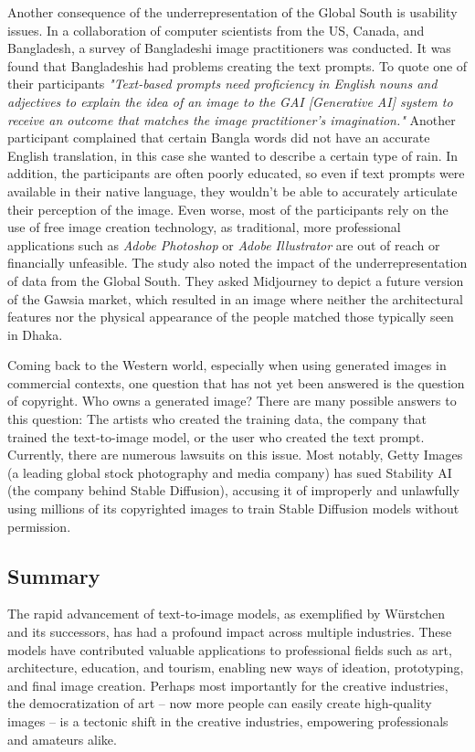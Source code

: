 \documentclass[11pt]{article}
\begin{document}
Another consequence of the underrepresentation of the Global South is usability issues. In a collaboration of computer scientists from the US, Canada, and Bangladesh\cite{mim2024impactoftexttoimagetoolsinglobalsouth}, a survey of Bangladeshi image practitioners was conducted. It was found that Bangladeshis had problems creating the text prompts. To quote one of their participants \textit{"Text-based prompts need proficiency in English nouns and adjectives to explain the idea of an image to the GAI [Generative AI] system to receive an outcome that matches the image practitioner's imagination."} Another participant complained that certain Bangla words did not have an accurate English translation, in this case she wanted to describe a certain type of rain. In addition, the participants are often poorly educated, so even if text prompts were available in their native language, they wouldn't be able to accurately articulate their perception of the image. Even worse, most of the participants rely on the use of free image creation technology, as traditional, more professional applications such as \textit{Adobe Photoshop} or \textit{Adobe Illustrator} are out of reach or financially unfeasible. The study also noted the impact of the underrepresentation of data from the Global South. They asked Midjourney to depict a future version of the Gawsia market, which resulted in an image where neither the architectural features nor the physical appearance of the people matched those typically seen in Dhaka.

Coming back to the Western world, especially when using generated images in commercial contexts, one question that has not yet been answered is the question of copyright. Who owns a generated image? There are many possible answers to this question: The artists who created the training data, the company that trained the text-to-image model, or the user who created the text prompt. Currently, there are numerous lawsuits on this issue. Most notably, Getty Images (a leading global stock photography and media company) has sued Stability AI (the company behind Stable Diffusion), accusing it of improperly and unlawfully using millions of its copyrighted images to train Stable Diffusion models without permission\cite{cnn2023gettyimagesvsstabilityai}.

\subsection{Summary}

The rapid advancement of text-to-image models, as exemplified by Würstchen and its successors, has had a profound impact across multiple industries. These models have contributed valuable applications to professional fields such as art, architecture, education, and tourism, enabling new ways of ideation, prototyping, and final image creation. Perhaps most importantly for the creative industries, the democratization of art – now more people can easily create high-quality images – is a tectonic shift in the creative industries, empowering professionals and amateurs alike.
\end{document}
